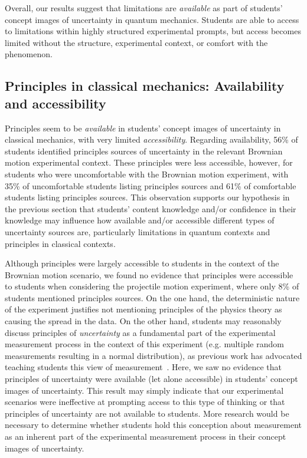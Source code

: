 \documentclass[english,aps,prstper,reprint,showpacs,longbibliography,superscriptaddress,nofootinbib]{revtex4-2}
\begin{document}
Overall, our results suggest that limitations are \emph{available} as part of students' concept images of uncertainty in quantum mechanics. Students are able to access to limitations within highly structured experimental prompts, but access becomes limited without the structure, experimental context, or comfort with the phenomenon. %

\subsection{Principles in classical mechanics: Availability and accessibility}

Principles seem to be \emph{available} in students' concept images of uncertainty in classical mechanics, with very limited \emph{accessibility}. Regarding availability, 56\% of students identified principles sources of uncertainty in the relevant Brownian motion experimental context. These principles were less accessible, however, for students who were uncomfortable with the Brownian motion experiment, with 35\% of uncomfortable students listing principles sources and 61\% of comfortable students listing principles sources. This observation supports our hypothesis in the previous section that students' content knowledge and/or confidence in their knowledge may influence how available and/or accessible different types of uncertainty sources are, particularly limitations in quantum contexts and principles in classical contexts.

Although principles were largely accessible to students in the context of the Brownian motion scenario, we found no evidence that principles were accessible to students when considering the projectile motion experiment, where only 8\% of students mentioned principles sources. On the one hand, the deterministic nature of the experiment justifies not mentioning principles of the physics theory as causing the spread in the data. On the other hand, students may reasonably discuss principles of \emph{uncertainty} as a fundamental part of the experimental measurement process in the context of this experiment (e.g. multiple random measurements resulting in a normal distribution), as previous work has advocated teaching students this view of measurement~\cite{Evangelinos1999,Evangelinos2002,Allie2003,Pillay2008,Buffler2008}. Here, we saw no evidence that principles of uncertainty were available (let alone accessible) in students' concept images of uncertainty. This result may simply indicate that our experimental scenarios were ineffective at prompting access to this type of thinking or that principles of uncertainty are not available to students. More research would be necessary to determine whether students hold this conception about measurement as an inherent part of the experimental measurement process in their concept images of uncertainty.
\end{document}
